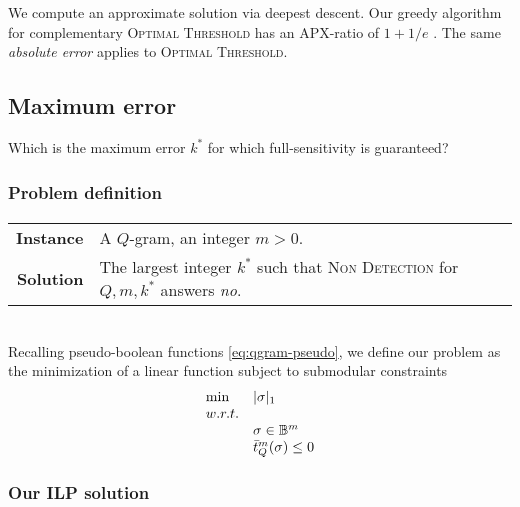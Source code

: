 We compute an approximate solution via deepest descent.
Our greedy algorithm for complementary \textsc{Optimal Threshold} has an APX-ratio of $1 + 1/e$ \citep{NemhauserWolseyFisher78}.
The same \emph{absolute error} applies to \textsc{Optimal Threshold}.

\subsection{Maximum error}

Which is the maximum error $k^*$ for which full-sensitivity is guaranteed?

\subsubsection{Problem definition}

\paragraph{}
\begin{tabular}{rl}
{\bf Instance}	&	A $Q$-gram, an integer $m > 0$.\\
{\bf Solution}	&	The largest integer $k^*$ such that \textsc{Non Detection} for $Q,m,k^*$ answers \emph{no}.\\
\end{tabular}
\\

Recalling pseudo-boolean functions \ref{eq:qgram-pseudo}, we define our problem as the minimization of a linear function subject to submodular constraints
\begin{equation}
\begin{array}{ll}
\text{min} & |\sigma|_1			\\
w.r.t.								\\
& \sigma \in \mathbb {B}^m					\\
& \bar{t}_{Q}^{m}(\sigma) \leq 0	\\
\end{array}
\end{equation}

\subsubsection{Our ILP solution}

